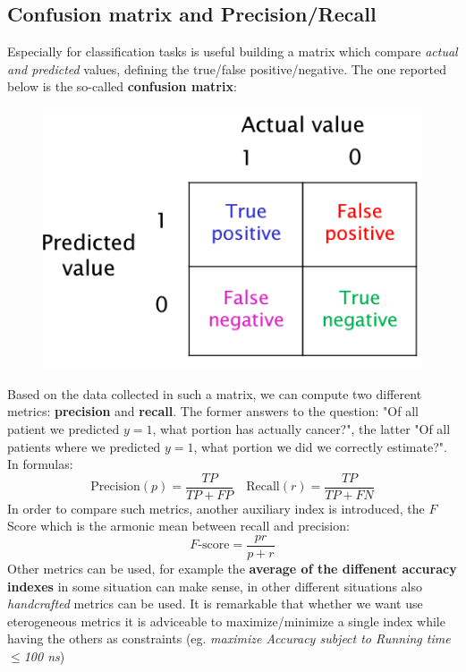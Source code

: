 \subsection{Confusion matrix and Precision/Recall}
Especially for classification tasks is useful building a matrix which compare \textit{actual and predicted} values, defining the true/false positive/negative. The one reported below is the so-called \textbf{confusion matrix}:

\begin{figure}[h]
    \centering
    \includegraphics[scale=0.7]{img/confusion.png}
\end{figure}
\noindent
Based on the data collected in such a matrix, we can compute two different metrics: \textbf{precision} and \textbf{recall}. The former answers to the question: "Of all patient we predicted $y=1$, what portion has actually cancer?", the latter "Of all patients where we predicted $y=1$, what portion we did we correctly estimate?". In formulas:
\begin{equation}
    \text{Precision}(p)=\frac{TP}{TP+FP}\quad
    \text{Recall}(r)=\frac{TP}{TP+FN}
\end{equation}
In order to compare such metrics, another auxiliary index is introduced, the $F$ Score which is the armonic mean between recall and precision:
\begin{equation}
    F\text{-score}=\frac{pr}{p+r}
\end{equation}
Other metrics can be used, for example the \textbf{average of the diffenent accuracy indexes} in some situation can make sense, in other different situations also \textit{handcrafted} metrics can be used. It is remarkable that whether we want use eterogeneous metrics it is adviceable to maximize/minimize a single index while having the others as constraints (eg. \textit{maximize \textsf{Accuracy} subject to \textsf{Running time}$\le$100 ns})

